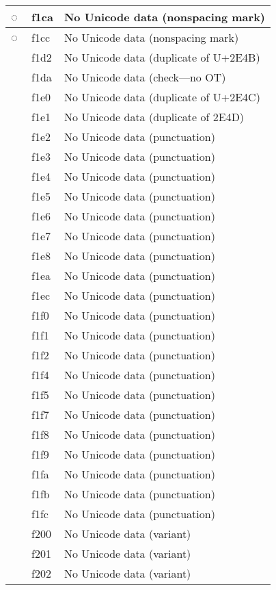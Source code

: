 \documentclass[12pt,letterpaper,openany]{book}
\begin{document}
\begin{center}
\begin{supertabular}{|m{0.25in}|m{0.5in}|m{4in}|}
◌ & f1ca & No Unicode data (nonspacing mark)\\\hline
◌ & f1cc & No Unicode data (nonspacing mark)\\\hline
 & f1d2 & No Unicode data (duplicate of U+2E4B)\\\hline
 & f1da & No Unicode data (check---no OT)\\\hline
 & f1e0 & No Unicode data (duplicate of U+2E4C)\\\hline
 & f1e1 & No Unicode data (duplicate of 2E4D)\\\hline
 & f1e2 & No Unicode data (punctuation)\\\hline
 & f1e3 & No Unicode data (punctuation)\\\hline
 & f1e4 & No Unicode data (punctuation)\\\hline
 & f1e5 & No Unicode data (punctuation)\\\hline
 & f1e6 & No Unicode data (punctuation)\\\hline
 & f1e7 & No Unicode data (punctuation)\\\hline
 & f1e8 & No Unicode data (punctuation)\\\hline
 & f1ea & No Unicode data (punctuation)\\\hline
 & f1ec & No Unicode data (punctuation)\\\hline
 & f1f0 & No Unicode data (punctuation)\\\hline
 & f1f1 & No Unicode data (punctuation)\\\hline
 & f1f2 & No Unicode data (punctuation)\\\hline
 & f1f4 & No Unicode data (punctuation)\\\hline
 & f1f5 & No Unicode data (punctuation)\\\hline
 & f1f7 & No Unicode data (punctuation)\\\hline
 & f1f8 & No Unicode data (punctuation)\\\hline
 & f1f9 & No Unicode data (punctuation)\\\hline
 & f1fa & No Unicode data (punctuation)\\\hline
 & f1fb & No Unicode data (punctuation)\\\hline
 & f1fc & No Unicode data (punctuation)\\\hline
 & f200 & No Unicode data (variant)\\\hline
 & f201 & No Unicode data (variant)\\\hline
 & f202 & No Unicode data (variant)\\\hline

\end{supertabular}
\end{center}
\end{document}

